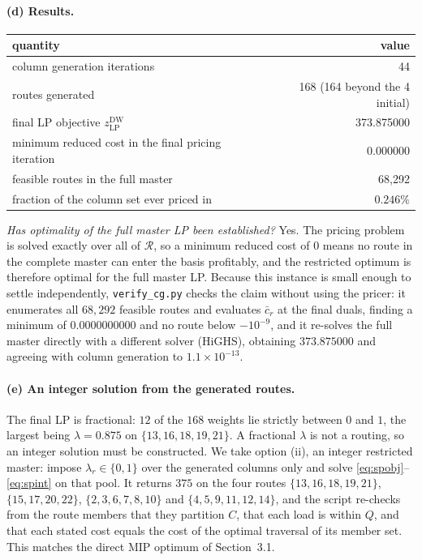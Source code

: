 \documentclass[11pt]{article}
\begin{document}
\paragraph{(d) Results.}

\begin{center}
\begin{tabular}{@{}lr@{}}
\toprule
quantity & value\\
\midrule
column generation iterations & 44\\
routes generated & 168 \;(164 beyond the 4 initial)\\
final LP objective $z^{\mathrm{DW}}_{\mathrm{LP}}$ & 373.875000\\
minimum reduced cost in the final pricing iteration & $0.000000$\\
feasible routes in the full master & 68{,}292\\
fraction of the column set ever priced in & $0.246\%$\\
\bottomrule
\end{tabular}
\end{center}

\emph{Has optimality of the full master LP been established?} Yes. The
pricing problem is solved exactly over all of $\mathcal{R}$, so a
minimum reduced cost of $0$ means no route in the complete master can
enter the basis profitably, and the restricted optimum is therefore
optimal for the full master LP. Because this instance is small enough
to settle independently, \texttt{verify\_cg.py} checks the claim
without using the pricer: it enumerates all $68{,}292$ feasible routes
and evaluates $\bar{c}_r$ at the final duals, finding a minimum of
$0.0000000000$ and no route below $-10^{-9}$, and it re-solves the full
master directly with a different solver (HiGHS), obtaining
$373.875000$ and agreeing with column generation to
$1.1 \times 10^{-13}$.

\paragraph{(e) An integer solution from the generated routes.}
The final LP is fractional: $12$ of the $168$ weights lie strictly
between $0$ and $1$, the largest being $\lambda = 0.875$ on
$\{13,16,18,19,21\}$. A fractional $\lambda$ is not a routing, so an
integer solution must be constructed. We take option (ii), an integer
restricted master: impose $\lambda_r \in \{0,1\}$ over the generated
columns only and solve \eqref{eq:spobj}--\eqref{eq:spint} on that
pool. It returns $375$ on the four routes
$\{13,16,18,19,21\}$, $\{15,17,20,22\}$, $\{2,3,6,7,8,10\}$ and
$\{4,5,9,11,12,14\}$, and the script re-checks from the route members
that they partition $C$, that each load is within $Q$, and that each
stated cost equals the cost of the optimal traversal of its member
set. This matches the direct MIP optimum of Section~3.1.
\end{document}
